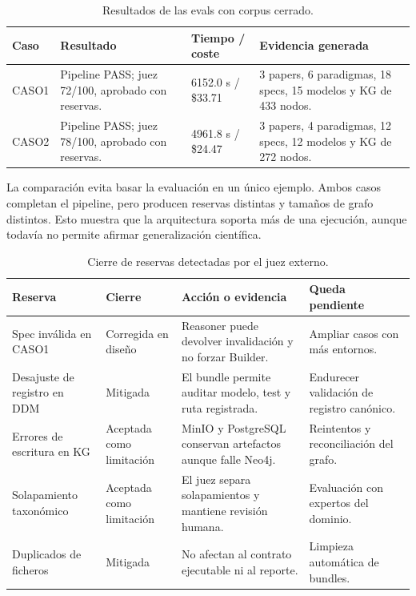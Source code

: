\begin{table}[H]
\begin{center}
\small
\begin{tabular}{|p{1.6cm}|p{3.1cm}|p{2.4cm}|p{5.1cm}|} \hline
\textbf{Caso} & \textbf{Resultado} & \textbf{Tiempo / coste} & \textbf{Evidencia generada} \\ \hline
CASO1 & Pipeline PASS; juez 72/100, aprobado con reservas. & 6152.0 s / \$33.71 & 3 papers, 6 paradigmas, 18 specs, 15 modelos y KG de 433 nodos. \\ \hline
CASO2 & Pipeline PASS; juez 78/100, aprobado con reservas. & 4961.8 s / \$24.47 & 3 papers, 4 paradigmas, 12 specs, 12 modelos y KG de 272 nodos. \\ \hline
\end{tabular}
\caption{Resultados de las evals con corpus cerrado.}
\end{center}
\end{table}

La comparación evita basar la evaluación en un único ejemplo. Ambos casos
completan el pipeline, pero producen reservas distintas y tamaños de grafo
distintos. Esto muestra que la arquitectura soporta más de una ejecución, aunque
todavía no permite afirmar generalización científica.

\begin{table}[H]
\begin{center}
\scriptsize
\begin{tabular}{|p{2.8cm}|p{2.0cm}|p{4.6cm}|p{3.0cm}|} \hline
\textbf{Reserva} & \textbf{Cierre} & \textbf{Acción o evidencia} & \textbf{Queda pendiente} \\ \hline
Spec inválida en CASO1 & Corregida en diseño & Reasoner puede devolver invalidación y no forzar Builder. & Ampliar casos con más entornos. \\ \hline
Desajuste de registro en DDM & Mitigada & El bundle permite auditar modelo, test y ruta registrada. & Endurecer validación de registro canónico. \\ \hline
Errores de escritura en KG & Aceptada como limitación & MinIO y PostgreSQL conservan artefactos aunque falle Neo4j. & Reintentos y reconciliación del grafo. \\ \hline
Solapamiento taxonómico & Aceptada como limitación & El juez separa solapamientos y mantiene revisión humana. & Evaluación con expertos del dominio. \\ \hline
Duplicados de ficheros & Mitigada & No afectan al contrato ejecutable ni al reporte. & Limpieza automática de bundles. \\ \hline
\end{tabular}
\caption{Cierre de reservas detectadas por el juez externo.}
\end{center}
\end{table}

